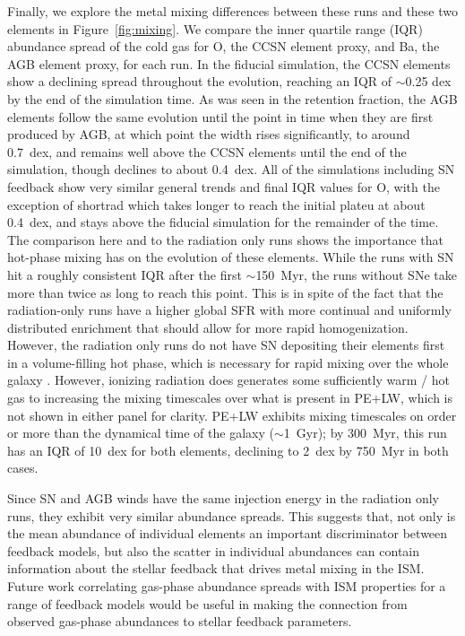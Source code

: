 \documentclass[twocolumn]{aastex62}
\begin{document}
Finally, we explore the metal mixing differences between these runs and these two elements in Figure~\ref{fig:mixing}. We compare the inner quartile range (IQR) abundance spread of the cold gas for O, the CCSN element proxy, and Ba, the AGB element proxy, for each run. In the fiducial simulation, the CCSN elements show a declining spread throughout the evolution, reaching an IQR of $\sim$0.25 dex by the end of the simulation time. As was seen in the retention fraction, the AGB elements follow the same evolution until the point in time when they are first produced by AGB, at which point the width rises significantly, to around 0.7~dex, and remains well above the CCSN elements until the end of the simulation, though declines to about 0.4~dex. All of the simulations including SN feedback show very similar general trends and final IQR values for O, with the exception of shortrad which takes longer to reach the initial plateu at about 0.4~dex, and stays above the fiducial simulation for the remainder of the time. The comparison here and to the radiation only runs shows the importance that hot-phase mixing has on the evolution of these elements. While the runs with SN hit a roughly consistent IQR after the first $\sim$150~Myr, the runs without SNe take more than twice as long to reach this point. This is in spite of the fact that the radiation-only runs have a higher global SFR with more continual and uniformly distributed enrichment that should allow for more rapid homogenization. However, the radiation only runs do not have SN depositing their elements first in a volume-filling hot phase, which is necessary for rapid mixing over the whole galaxy \citep{Emerick2018b}. However, ionizing radiation does generates some sufficiently warm / hot gas to increasing the mixing timescales over what is present in PE+LW, which is not shown in either panel for clarity. PE+LW exhibits mixing timescales on order or more than the dynamical time of the galaxy ($\sim$1~Gyr); by 300~Myr, this run has an IQR of 10~dex for both elements, declining to 2~dex by 750~Myr in both cases.

Since SN and AGB winds have the same injection energy in the radiation only runs, they exhibit very similar abundance spreads. This suggests that, not only is the mean abundance of individual elements an important discriminator between feedback models, but also the scatter in individual abundances can contain information about the stellar feedback that drives metal mixing in the ISM. Future work correlating gas-phase abundance spreads with ISM properties for a range of feedback models would be useful in making the connection from observed gas-phase abundances to stellar feedback parameters.
\end{document}
